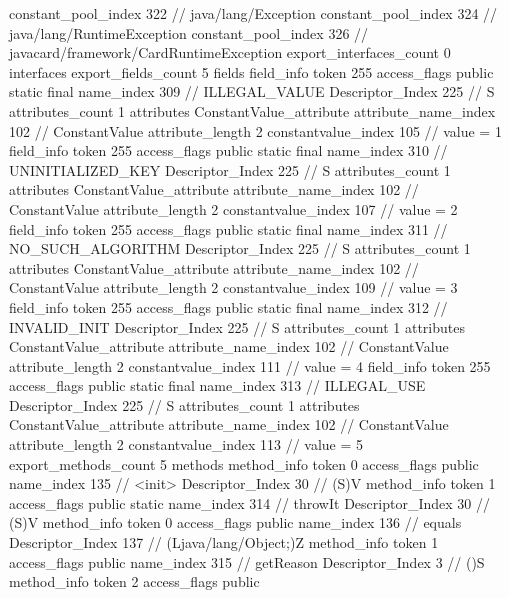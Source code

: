 {{{{				constant_pool_index	322		// java/lang/Exception
				constant_pool_index	324		// java/lang/RuntimeException
				constant_pool_index	326		// javacard/framework/CardRuntimeException
			}
			export_interfaces_count	0
			interfaces {
			}
			export_fields_count	5
			fields {
			field_info {
				token	255
				access_flags	public static final
				name_index	309		// ILLEGAL_VALUE
				Descriptor_Index	225		// S
				attributes_count	1
				attributes {
				ConstantValue_attribute {
					attribute_name_index	102		// ConstantValue
					attribute_length	2
					constantvalue_index	105		// value = 1
				}
				}
			}
			field_info {
				token	255
				access_flags	public static final
				name_index	310		// UNINITIALIZED_KEY
				Descriptor_Index	225		// S
				attributes_count	1
				attributes {
				ConstantValue_attribute {
					attribute_name_index	102		// ConstantValue
					attribute_length	2
					constantvalue_index	107		// value = 2
				}
				}
			}
			field_info {
				token	255
				access_flags	public static final
				name_index	311		// NO_SUCH_ALGORITHM
				Descriptor_Index	225		// S
				attributes_count	1
				attributes {
				ConstantValue_attribute {
					attribute_name_index	102		// ConstantValue
					attribute_length	2
					constantvalue_index	109		// value = 3
				}
				}
			}
			field_info {
				token	255
				access_flags	public static final
				name_index	312		// INVALID_INIT
				Descriptor_Index	225		// S
				attributes_count	1
				attributes {
				ConstantValue_attribute {
					attribute_name_index	102		// ConstantValue
					attribute_length	2
					constantvalue_index	111		// value = 4
				}
				}
			}
			field_info {
				token	255
				access_flags	public static final
				name_index	313		// ILLEGAL_USE
				Descriptor_Index	225		// S
				attributes_count	1
				attributes {
				ConstantValue_attribute {
					attribute_name_index	102		// ConstantValue
					attribute_length	2
					constantvalue_index	113		// value = 5
				}
				}
			}
			}
			export_methods_count	5
			methods {
				method_info {
					token	0
					access_flags	public
					name_index	135		// <init>
					Descriptor_Index	30		// (S)V
				}
				method_info {
					token	1
					access_flags	public static
					name_index	314		// throwIt
					Descriptor_Index	30		// (S)V
				}
				method_info {
					token	0
					access_flags	public
					name_index	136		// equals
					Descriptor_Index	137		// (Ljava/lang/Object;)Z
				}
				method_info {
					token	1
					access_flags	public
					name_index	315		// getReason
					Descriptor_Index	3		// ()S
				}
				method_info {
					token	2
					access_flags	public
}}}}}
